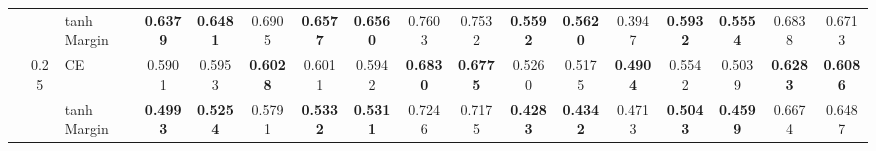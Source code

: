 \documentclass[sigconf,authordraft]{acmart}
\begin{document}
\begin{table*}
{\begin{tabular}{lcl|ccccccc|ccccccc}
                                &      & tanh Margin &                         \textbf{0.6379} &         \textbf{0.6481} &              0.6905 &         \textbf{0.6577} &  \textbf{0.6560} &                       0.7603 &                       0.7532 &                        \textbf{0.5592} &         \textbf{0.5620} &              0.3947 &         \textbf{0.5932} &  \textbf{0.5554} &                       0.6838 &                       0.6713 \\
    \cline{2-17}
                                & \multirow{2}{*}{0.25} & CE &                                  0.5901 &                  0.5953 &     \textbf{0.6028} &                  0.6011 &           0.5942 &              \textbf{0.6830} &              \textbf{0.6775} &                                 0.5260 &                  0.5175 &     \textbf{0.4904} &                  0.5542 &           0.5039 &              \textbf{0.6283} &              \textbf{0.6086} \\
                                &      & tanh Margin &                         \textbf{0.4993} &         \textbf{0.5254} &              0.5791 &         \textbf{0.5332} &  \textbf{0.5311} &                       0.7246 &                       0.7175 &                        \textbf{0.4283} &         \textbf{0.4342} &              0.4713 &         \textbf{0.5043} &  \textbf{0.4599} &                       0.6674 &                       0.6487 \\
    \bottomrule
  \end{tabular}
  }
\end{table*}
\end{document}
